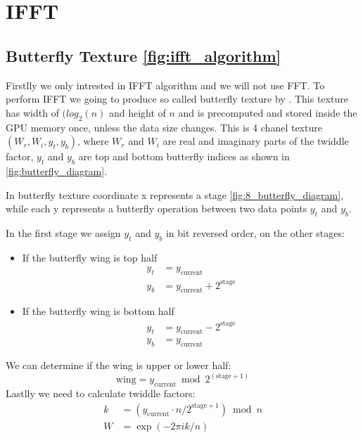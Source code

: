 \section{IFFT}
\subsection{Butterfly Texture \ref{fig:ifft_algorithm}}
Firstlly we only intrested in IFFT algorithm and we will not use FFT.
To perform IFFT we going to produce so called butterfly texture by \cite[Fl{\"u}gge Fynn-Jorin]{flugge2017}.
This texture has width of $(log_2(n)$ and height of $n$ and is precomputed and stored inside the GPU memory once, unless the data size changes. This is 4 chanel texture $(W_r, W_i, y_t, y_b)$,
where $W_r$ and $W_i$ are real and imaginary parts of the twiddle factor, $y_t$ and $y_b$ are top and bottom butterfly indices as shown in \ref{fig:butterfly_diagram}.

In butterfly texture coordinate x represents a stage \ref{fig:8_butterfly_diagram}, while each y represents a butterfly operation between two data points $y_t$ and $y_b$.

In the first stage we assign $y_t$ and $y_b$ in bit reversed order, on the other stages:
\begin{itemize}
    \item If the butterfly wing is top half
    \begin{equation}
        \begin{split}
            y_t &= y_{\text{current}} \\
            y_b &= y_{\text{current}} + 2^{\text{stage}}
        \end{split}
    \end{equation}
    \item If the butterfly wing is bottom half
    \begin{equation}
        \begin{split}
            y_t &= y_{\text{current}} - 2^{\text{stage}} \\
            y_b &= y_{\text{current}}
        \end{split}
    \end{equation}
\end{itemize}
We can determine if the wing is upper or lower half:
\begin{equation}
    \text{wing} = y_{\text{current}} \bmod 2^{(\text{stage} + 1)}
\end{equation}
Lastlly we need to calculate twiddle factors:
\begin{equation}
    \begin{split}
        k &= (y_{\text{current}} \cdot n / 2^{\text{stage} + 1}) \bmod n \\
        W &= \exp(-2\pi i k / n)
    \end{split}
\end{equation}

